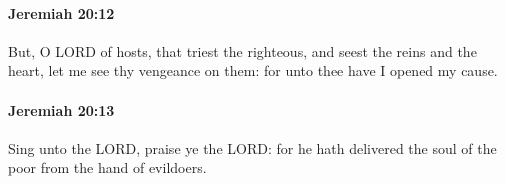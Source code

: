 		\paragraph{Jeremiah 20:12} %
			\label{JEREMIAH-20-12}

			But, O LORD of hosts, that triest the righteous, and seest the reins and the heart, let me see thy vengeance on them: for unto thee have I opened my cause.


		\paragraph{Jeremiah 20:13} %
			\label{JEREMIAH-20-13}

			Sing unto the LORD, praise ye the LORD: for he hath delivered the soul of the poor from the hand of evildoers.


